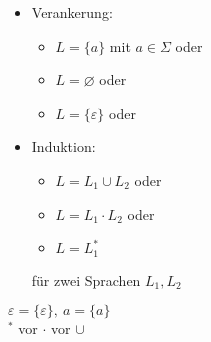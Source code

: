 \documentclass[a4paper]{article}
\let\epsilon\varepsilon
\begin{document}
\begin{itemize}
	\item Verankerung:
	\begin{itemize}
		\item $L=\{a\}$ mit $a\in\Sigma$ oder
		\item $L=\varnothing$ oder
		\item $L=\{\epsilon\}$ oder
	\end{itemize}
	\item Induktion:
	\begin{itemize}
		\item $L=L_1\cup L_2$ oder
		\item $L=L_1\cdot L_2$ oder
		\item $L=L_1^*$
	\end{itemize}
	für zwei Sprachen $L_1,L_2$
\end{itemize}
$\epsilon=\{\epsilon\},\ a=\{a\}$\\
$^*$ vor $\cdot$ vor $\cup$
\end{document}
